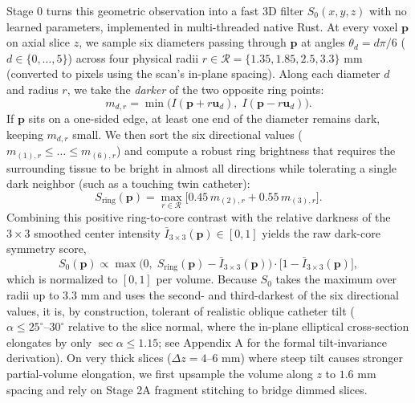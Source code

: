 \documentclass[
  11pt,
]{article}
\begin{document}
Stage 0 turns this geometric observation into a fast 3D filter
\(S_0(x,y,z)\) with no learned parameters, implemented in multi-threaded
native Rust. At every voxel \(\mathbf{p}\) on axial slice \(z\), we
sample six diameters passing through \(\mathbf{p}\) at angles
\(\theta_d = d\pi/6\) (\(d \in \{0, \dots, 5\}\)) across four physical
radii \(r \in \mathcal{R} = \{1.35, 1.85, 2.5, 3.3\}\text{ mm}\)
(converted to pixels using the scan's in-plane spacing). Along each
diameter \(d\) and radius \(r\), we take the \emph{darker} of the two
opposite ring points:
\[m_{d,r} = \min\!\big(I(\mathbf{p} + r\mathbf{u}_d),\; I(\mathbf{p} - r\mathbf{u}_d)\big).\]
If \(\mathbf{p}\) sits on a one-sided edge, at least one end of the
diameter remains dark, keeping \(m_{d,r}\) small. We then sort the six
directional values (\(m_{(1),r} \le \dots \le m_{(6),r}\)) and compute a
robust ring brightness that requires the surrounding tissue to be bright
in almost all directions while tolerating a single dark neighbor (such
as a touching twin catheter):
\[S_{\text{ring}}(\mathbf{p}) = \max_{r \in \mathcal{R}} \big[0.45\, m_{(2),r} + 0.55\, m_{(3),r}\big].\]
Combining this positive ring-to-core contrast with the relative darkness
of the \(3 \times 3\) smoothed center intensity
\(\bar{I}_{3\times 3}(\mathbf{p}) \in [0, 1]\) yields the raw dark-core
symmetry score,
\[S_0(\mathbf{p}) \propto \max\!\big(0,\; S_{\text{ring}}(\mathbf{p}) - \bar{I}_{3\times 3}(\mathbf{p})\big)\cdot\big[1 - \bar{I}_{3\times 3}(\mathbf{p})\big],\]
which is normalized to \([0, 1]\) per volume. Because \(S_0\) takes the
maximum over radii up to \(3.3\text{ mm}\) and uses the second- and
third-darkest of the six directional values, it is, by construction,
tolerant of realistic oblique catheter tilt
(\(\alpha \le 25^\circ\text{--}30^\circ\) relative to the slice normal,
where the in-plane elliptical cross-section elongates by only
\(\sec\alpha \le 1.15\); see Appendix A for the formal tilt-invariance
derivation). On very thick slices (\(\Delta z = 4\text{--}6\text{ mm}\))
where steep tilt causes stronger partial-volume elongation, we first
upsample the volume along \(z\) to \(1.6\text{ mm}\) spacing and rely on
Stage 2A fragment stitching to bridge dimmed slices.
\end{document}
